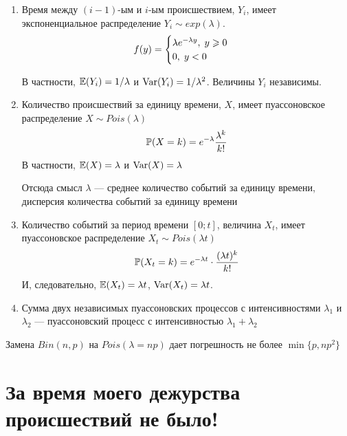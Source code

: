 \documentclass[12pt, a4paper]{article}
\begin{document}
\begin{enumerate}
	\item Время между $(i-1)$-ым и $i$-ым происшествием, $Y_i$, имеет экспоненциальное распределение $Y_i\sim exp(\lambda)$.
\[
f(y)=\begin{cases}
\lambda e^{-\lambda y}, \; y\geq 0 \\
0, \; y<0
\end{cases} \\
\]

В частности, $\E(Y_i)=1/\lambda$ и $\Var(Y_i)=1/\lambda^2$. Величины $Y_i$ независимы.

\item Количество происшествий за единицу времени, $X$, имеет пуассоновское распределение $X\sim Pois(\lambda)$
\[
\P(X=k)=e^{-\lambda} \frac{\lambda^k}{k!} \\
\]
В частности, $\E(X)=\lambda$ и $\Var(X)=\lambda$

 Отсюда смысл $\lambda$ — среднее количество событий за единицу времени, дисперсия количества событий за единицу времени
\item Количество событий за период времени $[0;t]$, величина $X_t$, имеет пуассоновское распределение $X_t \sim Pois(\lambda t)$
\[
\P(X_t=k)=e^{-\lambda  t} \cdot \frac{(\lambda  t)^k}{k!} \\
\]
И, следовательно, $\E(X_t)=\lambda  t$, $\Var(X_t)=\lambda t$.

\item Сумма двух независимых пуассоновских процессов с интенсивностями $\lambda_1$ и $\lambda_2$ — пуассоновский процесс с интенсивностью $\lambda_1+\lambda_2$
\end{enumerate}

Замена $Bin(n,p)$ на $Pois(\lambda=np)$ дает погрешность не более $\min\{p,np^2\}$ \\


\newpage
\section{За время моего дежурства происшествий не было!}
\end{document}
